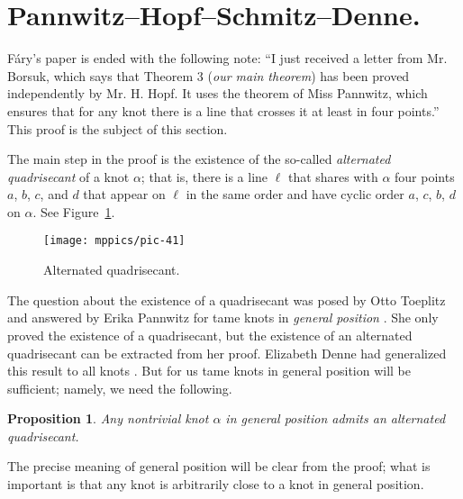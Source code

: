 \documentclass{article}
\newcommand*{\arXiv}[2]{#1} %
\theoremstyle{theorem}
\newtheorem{Proposition}[theorem]{Proposition}
\newtheorem{Crofton-type formula}[theorem]{Crofton-type formula}
\newtheorem{Douglas--Rado theorem}[theorem]{\arXiv{Douglas--Rado theorem}{Theorem}}
\newtheorem{Extended monotonicity theorem}[theorem]{\arXiv{Extended monotonicity theorem}{Theorem}}
\theoremstyle{definition}
\begin{document}
\section{Pannwitz--Hopf--Schmitz--Denne.}\label{sec:quadrisecant}

Fáry's paper \cite{fary} is ended with the following note:
``I just received a letter from Mr. Borsuk, which says that Theorem 3 (\textit{our \arXiv{main theorem}{Main Theorem}}) has been proved independently by Mr. H. Hopf.
It uses the theorem of Miss Pannwitz, which ensures that for any knot there is a line that crosses it at least in four
points.''
This proof is the subject of this section.

The main step in the proof is the existence of the so-called \emph{alternated quadrisecant} of a knot $\alpha$; that is, there is a line $\ell$ that shares with $\alpha$ four points $a$, $b$, $c$, and $d$
that appear on $\ell$ in the same order and have cyclic order $a$, $c$, $b$, $d$ on $\alpha$.
See Figure~\ref{fig7}.

\begin{figure}[!ht]
\vskip-0mm
\centering
\arXiv{\texttt{[image: mppics/pic-41]}}{\texttt{[image: pic-41]}}
\caption{Alternated quadrisecant.}
\label{fig7}
\vskip0mm
\end{figure}

The question about the existence of a quadrisecant was posed by Otto Toep\-litz and answered by Erika Pannwitz for tame knots in \emph{general position} \cite{pannwitz}.
She only proved the existence of a quadrisecant, but the existence of an alternated quadrisecant can be extracted from her proof.
Elizabeth Denne had generalized this result to all knots \cite{denne, denne-survey}.
But for us tame knots in general position will be sufficient;
namely, we need the following.


\begin{Proposition}\label{prop:quadrisecant}
Any nontrivial knot $\alpha$ in general position admits an \emph{alternated quadrisecant}.
\end{Proposition}

The precise meaning of general position will be clear from the proof;
what is important is that any knot is arbitrarily close to a knot in general position.
\end{document}
